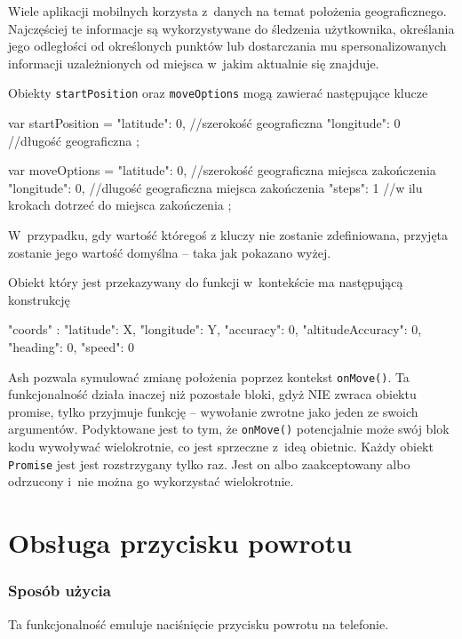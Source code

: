 \documentclass[brudnopis]{xmgr}
\begin{document}
Wiele aplikacji mobilnych korzysta z~danych na temat położenia geograficznego. Najczęściej te informacje są wykorzystywane do śledzenia użytkownika, określania jego odległości od określonych punktów lub dostarczania mu spersonalizowanych informacji uzależnionych od miejsca w~jakim aktualnie się znajduje. 

Obiekty \texttt{startPosition} oraz \texttt{moveOptions} mogą zawierać następujące klucze

\begin{javascriptcode}
   var startPosition = {
       "latitude": 0,  //szerokość geograficzna
       "longitude": 0  //długość geograficzna
   };
 
  var moveOptions = {
      "latitude": 0,  //szerokość geograficzna miejsca zakończenia
      "longitude": 0,  //dlugość geograficzna miejsca zakończenia
      "steps": 1  //w ilu krokach dotrzeć do miejsca zakończenia
  };
\end{javascriptcode}

W~przypadku, gdy wartość któregoś z kluczy nie zostanie zdefiniowana, przyjęta zostanie jego wartość domyślna -- taka jak pokazano wyżej. 

Obiekt który jest przekazywany do funkcji w~kontekście ma następującą konstrukcję 

\begin{javascriptcode}

{
  "coords" :  {
      "latitude": X, 
      "longitude": Y,
      "accuracy": 0, 
      "altitudeAccuracy": 0, 
      "heading": 0, 
      "speed": 0
   }
}

\end{javascriptcode}
Ash pozwala symulować zmianę położenia poprzez kontekst \texttt{onMove()}. Ta funkcjonalność działa inaczej niż pozostałe bloki, gdyż NIE zwraca obiektu promise, tylko przyjmuje funkcję -- wywołanie zwrotne jako jeden ze swoich argumentów. Podyktowane jest to tym, że \texttt{onMove()} potencjalnie może swój blok kodu wywoływać wielokrotnie, co jest sprzeczne z~ideą obietnic. Każdy obiekt \texttt{Promise} jest jest rozstrzygany tylko raz. Jest on albo zaakceptowany albo odrzucony i~nie można go wykorzystać wielokrotnie. 

\section{Obsługa przycisku powrotu}

\subsubsection{Sposób użycia}
Ta funkcjonalność emuluje naciśnięcie przycisku powrotu na telefonie. 
\end{document}
